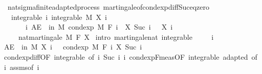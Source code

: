 \begin{isabellebody}
\endisatagproof
{\isafoldproof}%
%
\isadelimproof
\isanewline
%
\endisadelimproof
\isanewline
{}\isamarkupfalse%
\ {\isacharparenleft}{\kern0pt}\ nat{\isacharunderscore}{\kern0pt}sigma{\isacharunderscore}{\kern0pt}finite{\isacharunderscore}{\kern0pt}adapted{\isacharunderscore}{\kern0pt}process{\isacharparenright}{\kern0pt}\ martingale{\isacharunderscore}{\kern0pt}of{\isacharunderscore}{\kern0pt}cond{\isacharunderscore}{\kern0pt}exp{\isacharunderscore}{\kern0pt}diff{\isacharunderscore}{\kern0pt}Suc{\isacharunderscore}{\kern0pt}eq{\isacharunderscore}{\kern0pt}zero{\isacharcolon}{\kern0pt}\isanewline
\ \ \ integrable{\isacharcolon}{\kern0pt}\ {\isachardoublequoteopen}{\isasymAnd}i{\isachardot}{\kern0pt}\ integrable\ M\ {\isacharparenleft}{\kern0pt}X\ i{\isacharparenright}{\kern0pt}{\isachardoublequoteclose}\ \isanewline
\ \ \ \ \ \ \ {\isachardoublequoteopen}{\isasymAnd}i{\isachardot}{\kern0pt}\ AE\ {\isasymxi}\ in\ M{\isachardot}{\kern0pt}\ cond{\isacharunderscore}{\kern0pt}exp\ M\ {\isacharparenleft}{\kern0pt}F\ i{\isacharparenright}{\kern0pt}\ {\isacharparenleft}{\kern0pt}{\isasymlambda}{\isasymxi}{\isachardot}{\kern0pt}\ X\ {\isacharparenleft}{\kern0pt}Suc\ i{\isacharparenright}{\kern0pt}\ {\isasymxi}\ {\isacharminus}{\kern0pt}\ X\ i\ {\isasymxi}{\isacharparenright}{\kern0pt}\ {\isasymxi}\ {\isacharequal}{\kern0pt}\ {}{\isachardoublequoteclose}\ \isanewline
\ \ \ \ \ {\isachardoublequoteopen}nat{\isacharunderscore}{\kern0pt}martingale\ M\ F\ X{\isachardoublequoteclose}\isanewline
%
\isadelimproof
%
\endisadelimproof
%
\isatagproof
{}\isamarkupfalse%
\ {\isacharparenleft}{\kern0pt}intro\ martingale{\isacharunderscore}{\kern0pt}nat\ integrable{\isacharparenright}{\kern0pt}\ \isanewline
\ \ \isamarkupfalse%
\ i\ \isanewline
\ \ \isamarkupfalse%
\ {\isachardoublequoteopen}AE\ {\isasymxi}\ in\ M{\isachardot}{\kern0pt}\ X\ i\ {\isasymxi}\ {\isacharequal}{\kern0pt}\ cond{\isacharunderscore}{\kern0pt}exp\ M\ {\isacharparenleft}{\kern0pt}F\ i{\isacharparenright}{\kern0pt}\ {\isacharparenleft}{\kern0pt}X\ {\isacharparenleft}{\kern0pt}Suc\ i{\isacharparenright}{\kern0pt}{\isacharparenright}{\kern0pt}\ {\isasymxi}{\isachardoublequoteclose}\ \isamarkupfalse%
\ cond{\isacharunderscore}{\kern0pt}exp{\isacharunderscore}{\kern0pt}diff{\isacharbrackleft}{\kern0pt}OF\ integrable{\isacharparenleft}{\kern0pt}{}{\isacharcomma}{\kern0pt}{}{\isacharparenright}{\kern0pt}{\isacharcomma}{\kern0pt}\ of\ i\ {\isachardoublequoteopen}Suc\ i{\isachardoublequoteclose}\ i{\isacharbrackright}{\kern0pt}\ cond{\isacharunderscore}{\kern0pt}exp{\isacharunderscore}{\kern0pt}F{\isacharunderscore}{\kern0pt}meas{\isacharbrackleft}{\kern0pt}OF\ integrable\ adapted{\isacharcomma}{\kern0pt}\ of\ i{\isacharbrackright}{\kern0pt}\ assms{\isacharparenleft}{\kern0pt}{}{\isacharparenright}{\kern0pt}{\isacharbrackleft}{\kern0pt}of\ i{\isacharbrackright}{\kern0pt}\ \isamarkupfalse%

\end{isabellebody}

